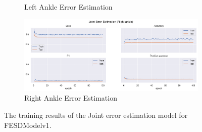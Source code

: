 \begin{figure}[!ht]
\begin{subfigure}[b]{0.47\linewidth}
      \caption{Left Ankle Error Estimation}
      \label{fig:v1_lean_jt_ee}
  \end{subfigure}
  \hfill
  \begin{subfigure}[b]{0.47\linewidth}
      \centering
      \includegraphics[width=\textwidth]{figures/Results/v1_bs_60_is_64_e_100/jt/Right ankle_ErrorEstimation.png}
      \caption{Right Ankle Error Estimation}
      \label{fig:v1_rian_jt_ee}
  \end{subfigure}
  \caption[Detailed Training results for FESDModelv2]{The training results of the Joint error estimation model for FESDModelv1.}
\end{figure}